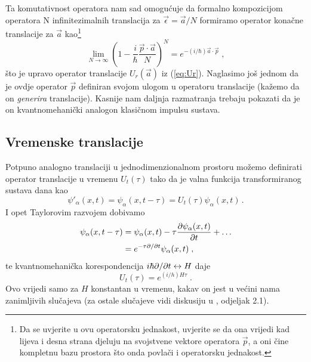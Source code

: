 Ta komutativnost operatora nam sad omogućuje da formalno kompozicijom
operatora N infinitezimalnih translacija za $\vec{\epsilon} = \vec{a}/N$ formiramo 
operator konačne translacije za $\vec{a}$ kao\footnote{Da se uvjerite u ovu
    operatorsku jednakost, uvjerite se da ona vrijedi kad lijeva i desna
    strana djeluju na svojstvene vektore operatora $\vec{p}$, a oni
    čine kompletnu bazu prostora što onda povlači i operatorsku jednakost.}
\begin{equation}
    \lim_{N\to\infty} \left(1 - \frac{i}{\hbar} \frac{\vec{p}\cdot\vec{a}}{N} \right)^N
        = e^{-(i/\hbar)\vec{a}\cdot\vec{p}} \;,
\end{equation}
što je upravo operator translacije $U_r(\vec{a})$ iz (\ref{eq:Ur}).
Naglasimo još jednom da je ovdje operator $\vec{p}$ definiran svojom ulogom
u operatoru translacije (kažemo da on \emph{generira} translacije). 
Kasnije nam daljnja razmatranja trebaju pokazati
da je on kvantnomehanički analogon klasičnom impulsu sustava.


\subsection{Vremenske translacije}

Potpuno analogno translaciji u jednodimenzionalnom prostoru
možemo definirati operator translacije u vremenu $U_{t}(\tau)$
tako da je valna funkcija transformiranog sustava dana kao
\begin{equation}
 \psi'_{\alpha}(x,t) = \psi_{\alpha}(x,t-\tau) = U_{t}(\tau)\psi_{\alpha}(x,t)\,.
\end{equation}
I opet Taylorovim razvojem dobivamo
\begin{equation}
\begin{split}
 \psi_{\alpha}(x,t-\tau)&=\psi_{\alpha}(x,t)-\tau\frac{\partial\psi_{\alpha}(x,t)}
{\partial t}+\ldots \\
&=e^{-\tau \partial / \partial  t} \psi_{\alpha}(x,t) \;,
\end{split}
\end{equation}
te kvantnomehanička korespondencija $i\hbar\partial /\partial t \leftrightarrow H$
daje
\begin{equation}
U_t(\tau)= e^{(i/h)H\tau} \;.
\end{equation}
Ovo vrijedi samo za $H$ konstantan u vremenu, kakav on jest u većini
nama zanimljivih slučajeva (za ostale slučajeve
vidi diskusiju u \cite{Sakurai:2011}, odjeljak 2.1).

